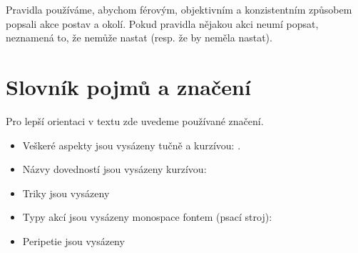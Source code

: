 Pravidla používáme, abychom férovým, objektivním a konzistentním způsobem popsali akce postav a okolí. Pokud pravidla nějakou akci neumí popsat, neznamená to, že nemůže nastat (resp. že by neměla nastat).

\section{Slovník pojmů a značení}
\label{sec:slovnik}
Pro lepší orientaci v textu zde uvedeme používané značení.

\begin{itemize}
\item Veškeré aspekty jsou vysázeny tučně a kurzívou: .
\item Názvy dovedností jsou vysázeny kurzívou: 
\item Triky jsou vysázeny 
\item Typy akcí jsou vysázeny monospace fontem (psací stroj): 
\item Peripetie jsou vysázeny 
\end{itemize}


 

